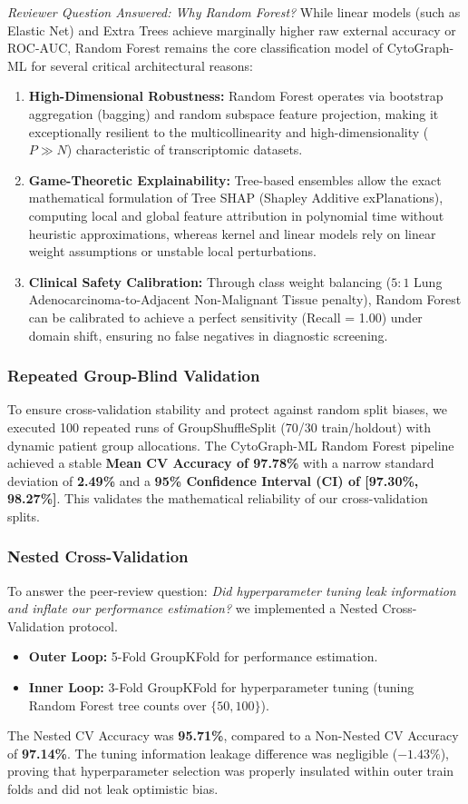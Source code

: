 \documentclass[journal,10pt]{IEEEtran}
\begin{document}
\textit{Reviewer Question Answered: Why Random Forest?}
While linear models (such as Elastic Net) and Extra Trees achieve marginally higher raw external accuracy or ROC-AUC, Random Forest remains the core classification model of CytoGraph-ML for several critical architectural reasons:
\begin{enumerate}
    \item \textbf{High-Dimensional Robustness:} Random Forest operates via bootstrap aggregation (bagging) and random subspace feature projection, making it exceptionally resilient to the multicollinearity and high-dimensionality ($P \gg N$) characteristic of transcriptomic datasets.
    \item \textbf{Game-Theoretic Explainability:} Tree-based ensembles allow the exact mathematical formulation of Tree SHAP (Shapley Additive exPlanations), computing local and global feature attribution in polynomial time without heuristic approximations, whereas kernel and linear models rely on linear weight assumptions or unstable local perturbations.
    \item \textbf{Clinical Safety Calibration:} Through class weight balancing ($5:1$ Lung Adenocarcinoma-to-Adjacent Non-Malignant Tissue penalty), Random Forest can be calibrated to achieve a perfect sensitivity (Recall = 1.00) under domain shift, ensuring no false negatives in diagnostic screening.
\end{enumerate}

\subsubsection{Repeated Group-Blind Validation}
To ensure cross-validation stability and protect against random split biases, we executed 100 repeated runs of GroupShuffleSplit (70/30 train/holdout) with dynamic patient group allocations. The CytoGraph-ML Random Forest pipeline achieved a stable \textbf{Mean CV Accuracy of 97.78\%} with a narrow standard deviation of \textbf{2.49\%} and a \textbf{95\% Confidence Interval (CI) of [97.30\%, 98.27\%]}. This validates the mathematical reliability of our cross-validation splits.

\subsubsection{Nested Cross-Validation}
To answer the peer-review question: \textit{Did hyperparameter tuning leak information and inflate our performance estimation?} we implemented a Nested Cross-Validation protocol. 
\begin{itemize}
    \item \textbf{Outer Loop:} 5-Fold GroupKFold for performance estimation.
    \item \textbf{Inner Loop:} 3-Fold GroupKFold for hyperparameter tuning (tuning Random Forest tree counts over $\{50, 100\}$).
\end{itemize}
The Nested CV Accuracy was \textbf{95.71\%}, compared to a Non-Nested CV Accuracy of \textbf{97.14\%}. The tuning information leakage difference was negligible (\textbf{$-1.43\%$}), proving that hyperparameter selection was properly insulated within outer train folds and did not leak optimistic bias.
\end{document}
